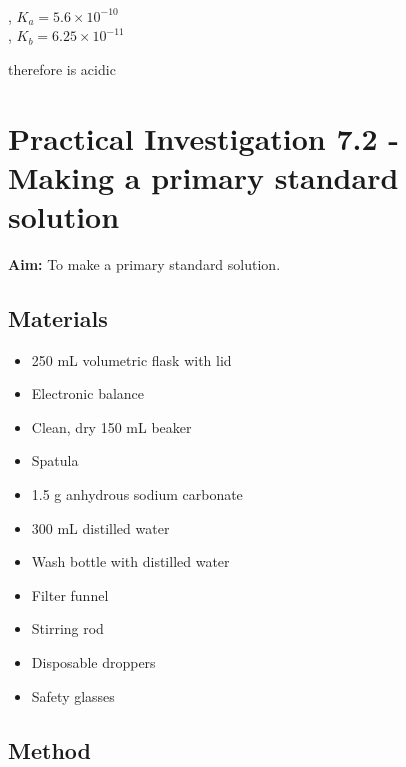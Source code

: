 		\begin{center}
			 \\
			 , $K_a = 5.6 \times 10^{-10}$  \\
			 , $K_b = 6.25 \times 10^{-11}$  
		\end{center}

		therefore is acidic

\section{Practical Investigation 7.2 - Making a primary standard solution} \label{06/03/2025}

	\textbf{Aim:} To make a primary standard solution.

	\subsection{Materials}
	
		\begin{itemize}
			\item 250 mL volumetric flask with lid
			\item Electronic balance
			\item Clean, dry 150 mL beaker
			\item Spatula
			\item 1.5 g anhydrous sodium carbonate
			\item 300 mL distilled water
			\item Wash bottle with distilled water
			\item Filter funnel
			\item Stirring rod
			\item Disposable droppers
			\item Safety glasses
		\end{itemize}

	\subsection{Method}

